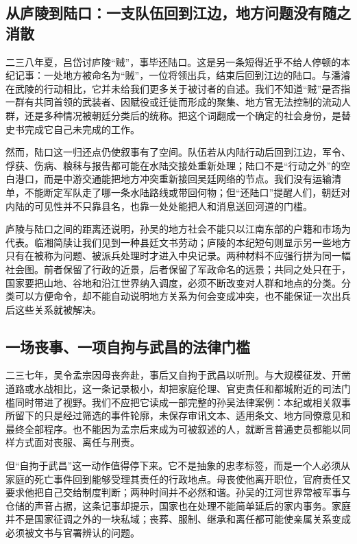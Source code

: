 \subsection{从庐陵到陆口：一支队伍回到江边，地方问题没有随之消散}
二三八年夏，吕岱讨庐陵“贼”，事毕还陆口。这是另一条短得近乎不给人停顿的本纪记事：一处地方被命名为“贼”，一位将领出兵，结束后回到江边的陆口。与潘濬在武陵的行动相比，它并未给我们更多关于被讨者的自述。我们不知道“贼”是否指一群有共同首领的武装者、因赋役或迁徙而形成的聚集、地方官无法控制的流动人群，还是多种情况被朝廷分类后的统称。把这个词翻成一个确定的社会身份，是替史书完成它自己未完成的工作。

然而，陆口这一归还点仍使叙事有了空间。队伍若从内陆行动后回到江边，军令、俘获、伤病、粮秣与报告都可能在水陆交接处重新处理；陆口不是“行动之外”的空白港口，而是中游交通能把地方冲突重新接回吴廷网络的节点。我们没有运输清单，不能断定军队走了哪一条水陆路线或带回何物；但“还陆口”提醒人们，朝廷对内陆的可见性并不只靠县名，也靠一处处能把人和消息送回河道的门槛。

庐陵与陆口之间的距离还说明，孙吴的地方社会不能只以江南东部的户籍和市场为代表。临湘简牍让我们见到一种县廷文书劳动；庐陵的本纪短句则显示另一些地方只有在被称为问题、被派兵处理时才进入中央记录。两种材料不应强行拼为同一幅社会图。前者保留了行政的近景，后者保留了军政命名的远景；共同之处只在于，国家要把山地、谷地和沿江世界纳入调度，必须不断改变对人群和地点的分类。分类可以方便命令，却不能自动说明地方关系为何会变成冲突，也不能保证一次出兵后这些关系就被解决。

\subsection{一场丧事、一项自拘与武昌的法律门槛}
二三七年，吴令孟宗因母丧奔赴，事后又自拘于武昌以听刑。与大规模征发、开凿道路或水战相比，这一条记录极小，却把家庭伦理、官吏责任和都城附近的司法门槛同时带进了视野。我们不应把它读成一部完整的孙吴法律案例：本纪或相关叙事所留下的只是经过筛选的事件轮廓，未保存审讯文本、适用条文、地方同僚意见和最终全部程序。也不能因为孟宗后来成为可被叙述的人，就断言普通吏员都能以同样方式面对丧服、离任与刑责。

但“自拘于武昌”这一动作值得停下来。它不是抽象的忠孝标签，而是一个人必须从家庭的死亡事件回到能够受理其责任的行政地点。母丧使他离开职位，官府责任又要求他把自己交给制度判断；两种时间并不必然和谐。孙吴的江河世界常被军事与仓储的声音占据，这条记事却提示，国家也在处理不能简单延后的家内事务。家庭并不是国家征调之外的一块私域；丧葬、服制、继承和离任都可能使亲属关系变成必须被文书与官署辨认的问题。

